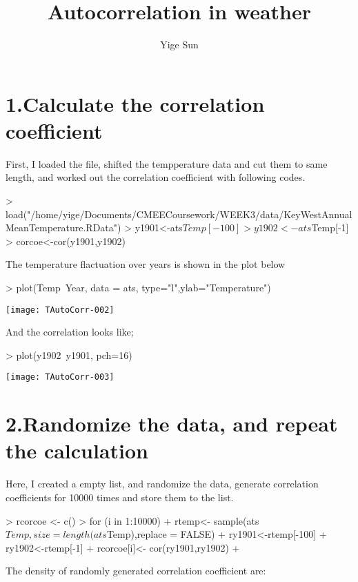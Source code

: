 \documentclass[12pt]{article}
\title{Autocorrelation in weather}
\author{Yige Sun}
\begin{document}
  \maketitle


\section*{1.Calculate the correlation coefficient}
  First, I loaded the file, shifted the tempperature data and cut them to same length, and worked out the correlation coefficient with following codes.
\begin{Schunk}
\begin{Sinput}
> load("/home/yige/Documents/CMEECoursework/WEEK3/data/KeyWestAnnualMeanTemperature.RData")
> y1901<-ats$Temp[-100]
> y1902<-ats$Temp[-1]
> corcoe<-cor(y1901,y1902)
\end{Sinput}
\end{Schunk}
  
  The temperature flactuation over years is shown in the plot below

\begin{Schunk}
\begin{Sinput}
> plot(Temp~Year, data = ats, type="l",ylab="Temperature")
\end{Sinput}
\end{Schunk}
\texttt{[image: TAutoCorr-002]}
  
  And the correlation looks like;
\begin{Schunk}
\begin{Sinput}
> plot(y1902~y1901, pch=16)
\end{Sinput}
\end{Schunk}
\texttt{[image: TAutoCorr-003]}

\section*{2.Randomize the data, and repeat the calculation}
  Here, I created a empty list, and randomize the data, generate correlation coefficients for 10000 times and store them to the list.
\begin{Schunk}
\begin{Sinput}
> rcorcoe <- c()
> for (i in 1:10000){
+   rtemp<- sample(ats$Temp,size = length(ats$Temp),replace = FALSE)
+   ry1901<-rtemp[-100]
+   ry1902<-rtemp[-1]
+   rcorcoe[i]<- cor(ry1901,ry1902)
+ }
\end{Sinput}
\end{Schunk}
The density of randomly generated correlation coefficient are:
\end{document}
